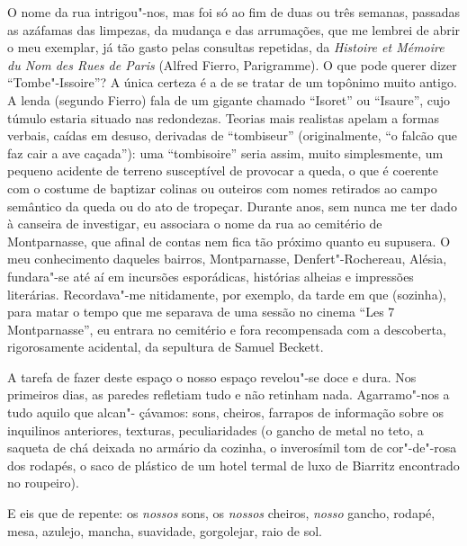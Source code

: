 O nome da rua intrigou"-nos, mas foi só ao fim de duas ou três semanas,
passadas as azáfamas das limpezas, da mudança e das arrumações, que me
lembrei de abrir o meu exemplar, já tão gasto pelas consultas repetidas,
da \emph{Histoire et Mémoire du Nom des Rues de Paris }(Alfred Fierro,
Parigramme). O que pode querer dizer ``Tombe"-Issoire''? A única certeza
é a de se tratar de um topônimo muito antigo. A lenda (segundo Fierro)
fala de um gigante chamado ``Isoret'' ou ``Isaure'', cujo túmulo estaria
situado nas redondezas. Teorias mais realistas apelam a formas
verbais, caídas em desuso, derivadas de ``tombiseur'' (originalmente,
``o falcão que faz cair a ave caçada''): uma ``tombisoire'' seria
assim, muito simplesmente, um pequeno acidente de terreno susceptível de
provocar a queda, o que é coerente com o costume de baptizar colinas ou
outeiros com nomes retirados ao campo semântico da queda ou do ato de
tropeçar. Durante anos, sem nunca me ter dado à canseira de investigar,
eu associara o nome da rua ao cemitério de Montparnasse, que afinal de
contas nem fica tão próximo quanto eu supusera. O meu conhecimento
daqueles bairros, Montparnasse, Denfert"-Rochereau, Alésia, fundara"-se
até aí em incursões esporádicas, histórias alheias e impressões literárias. Recordava"-me nitidamente, por exemplo, da tarde em que
(sozinha), para matar o tempo que me separava de uma sessão no cinema
``Les 7 Montparnasse'', eu entrara no cemitério e fora recompensada
com a descoberta, rigorosamente acidental, da sepultura de Samuel
Beckett.

A tarefa de fazer deste espaço o nosso espaço revelou"-se
doce e dura. Nos primeiros dias, as paredes refletiam tudo e não
retinham nada. Agarramo"-nos a tudo aquilo que alcan"- çávamos: sons,
cheiros, farrapos de informação sobre os inquilinos anteriores,
texturas, peculiaridades (o gancho de metal no teto, a saqueta de chá
deixada no armário da cozinha, o inverosímil tom de cor"-de"-rosa dos
rodapés, o saco de plástico de um hotel termal de luxo de Biarritz
encontrado no roupeiro).

E eis que de repente: os \emph{nossos }sons, os
\emph{nossos }cheiros, \emph{nosso }gancho, rodapé, mesa, azulejo,
mancha, suavidade, gorgolejar, raio de sol.

